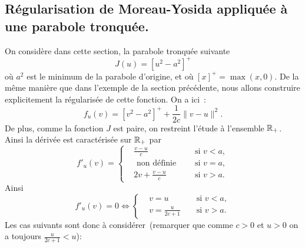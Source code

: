 \documentclass[main.tex]{subfiles}
\begin{document}
\subsection{Régularisation de Moreau-Yosida appliquée à une parabole tronquée.}
On considère dans cette section, la parabole tronquée suivante
\begin{equation}\label{eq:para_tronquee}
J(u) = [ u^2 - a^2 ]^+
\end{equation}
où $a^2$ est le minimum de la parabole d'origine, et où $[x]^+ = \max(x,0).$ De la même manière que dans l'exemple de la section précédente, nous allons construire explicitement la régularisée de cette fonction. On a ici~:
\begin{equation}
f_u(v) = [v^2-a^2]^+ + \frac{1}{2c}\|v-u\|^2.
\end{equation}
De plus, comme la fonction $J$ est paire, on restreint l'étude à l'ensemble $\mathbb{R}_+$. Ainsi la dérivée est caractérisée sur $\mathbb{R}_+$ par
\begin{equation}
f'_u(v) = \left\{  \begin{aligned}
&\frac{v-u}{c} && \textrm{ si } v<a,  \\
&\textrm{ non définie } && \textrm{ si } v=a, \\
& 2v+\frac{v-u}{c} && \textrm{ si } v>a.
\end{aligned}  \right.
\end{equation}
Ainsi
 \begin{equation} f'_u(v)=0
\Longleftrightarrow \left\{  \begin{aligned}
&v=u && \textrm{ si } v<a,  \\
& v=\frac{u}{2c+1} && \textrm{ si } v>a.
\end{aligned}  \right.
\end{equation}
Les cas suivants sont donc à considérer~(remarquer que comme $c>0$ et $u>0$ on a toujours $\frac{u}{2c+1}<u$):
\end{document}
